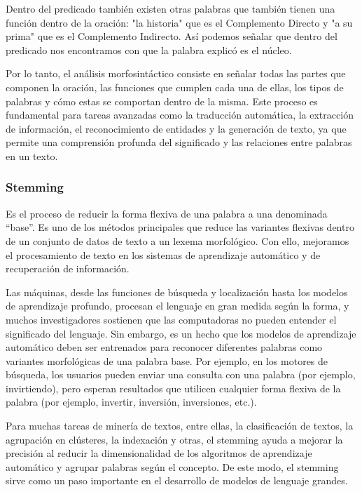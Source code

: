 Dentro del predicado también existen otras palabras que también tienen una función dentro de la oración: "la historia" que es el Complemento Directo y "a su prima" que es el Complemento Indirecto. Así podemos señalar que dentro del predicado nos encontramos con que la palabra explicó es el núcleo.

Por lo tanto, el análisis morfosintáctico consiste en señalar todas las partes que componen la oración, las funciones que cumplen cada una de ellas, los tipos de palabras y cómo estas se comportan dentro de la misma. Este proceso es fundamental para tareas avanzadas como la traducción automática, la extracción de información, el reconocimiento de entidades y la generación de texto, ya que permite una comprensión profunda del significado y las relaciones entre palabras en un texto.

\subsubsection{Stemming}

Es el proceso de reducir la forma flexiva de una palabra a una denominada “base”. Es uno de los métodos principales que reduce las variantes flexivas dentro de un conjunto de datos de texto a un lexema morfológico. Con ello, mejoramos el procesamiento de texto en los sistemas de aprendizaje automático y de recuperación de información.

Las máquinas, desde las funciones de búsqueda y localización hasta los modelos de aprendizaje profundo, procesan el lenguaje en gran medida según la forma, y muchos investigadores sostienen que las computadoras no pueden entender el significado del lenguaje. Sin embargo, es un hecho que los modelos de aprendizaje automático deben ser entrenados para reconocer diferentes palabras como variantes morfológicas de una palabra base. Por ejemplo, en los motores de búsqueda, los usuarios pueden enviar una consulta con una palabra (por ejemplo, invirtiendo), pero esperan resultados que utilicen cualquier forma flexiva de la palabra (por ejemplo, invertir, inversión, inversiones, etc.).

Para muchas tareas de minería de textos, entre ellas, la clasificación de textos, la agrupación en clústeres, la indexación y otras, el stemming ayuda a mejorar la precisión al reducir la dimensionalidad de los algoritmos de aprendizaje automático y agrupar palabras según el concepto. De este modo, el stemming sirve como un paso importante en el desarrollo de modelos de lenguaje grandes.

